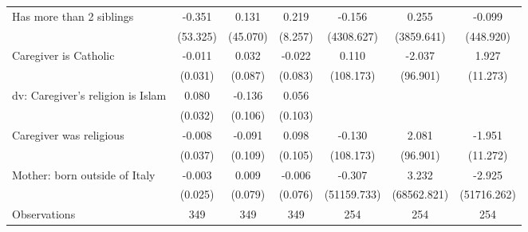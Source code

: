 {\begin{tabular}{l*{6}{c}}
\addlinespace
Has more than 2 siblings&      -0.351         &       0.131         &       0.219         &      -0.156         &       0.255         &      -0.099         \\
                    &    (53.325)         &    (45.070)         &     (8.257)         &  (4308.627)         &  (3859.641)         &   (448.920)         \\
\addlinespace
Caregiver is Catholic&      -0.011         &       0.032         &      -0.022         &       0.110         &      -2.037         &       1.927         \\
                    &     (0.031)         &     (0.087)         &     (0.083)         &   (108.173)         &    (96.901)         &    (11.273)         \\
\addlinespace
dv: Caregiver's religion is Islam&       0.080\sym{*}  &      -0.136         &       0.056         &                &                &                \\
                    &     (0.032)         &     (0.106)         &     (0.103)         &                 &                 &               \\
\addlinespace
Caregiver was religious&      -0.008         &      -0.091         &       0.098         &      -0.130         &       2.081         &      -1.951         \\
                    &     (0.037)         &     (0.109)         &     (0.105)         &   (108.173)         &    (96.901)         &    (11.272)         \\
\addlinespace
Mother: born outside of Italy&      -0.003         &       0.009         &      -0.006         &      -0.307         &       3.232         &      -2.925         \\
                    &     (0.025)         &     (0.079)         &     (0.076)         & (51159.733)         & (68562.821)         & (51716.262)         \\
\midrule
Observations        &         349         &         349         &         349         &         254         &         254         &         254         \\
\bottomrule
\end{tabular}
}
